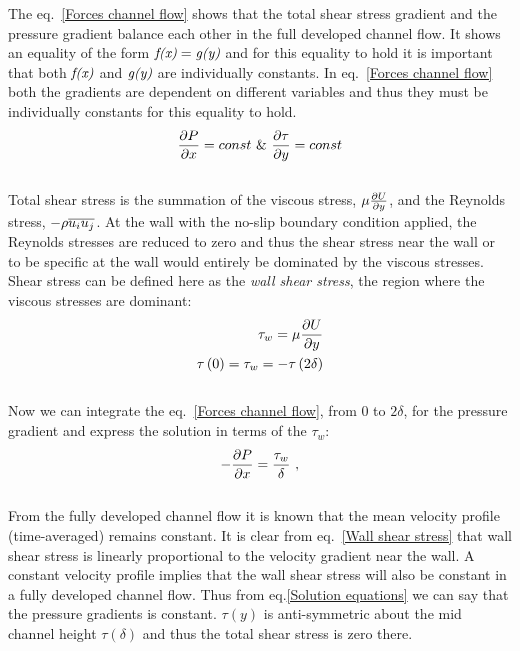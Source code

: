 The eq.~\ref{Forces channel flow} shows that the total shear stress gradient and the pressure gradient balance each other in the full developed channel flow. It shows an equality of the form $\emph{f(x)}= \emph{g(y)}$ and for this equality to hold it is important that both $\emph{f(x)}$ and $\emph{g(y)}$ are individually constants. In eq.~\ref{Forces channel flow} both the gradients are dependent on different variables and thus they must be individually constants for this equality to hold. $$\frac{\partial P}{\partial x} = const\  \&\  \frac{\partial \tau}{\partial y} = const$$\\
%
Total shear stress is the summation of the viscous stress, $ \mu \frac{\partial U}{\partial y} $, and the Reynolds stress, $- \rho\overline{u_iu_j}$. At the wall with the no-slip boundary condition applied, the Reynolds stresses are reduced to zero and thus the shear stress near the wall or to be specific at the wall would entirely be dominated by the viscous stresses. Shear stress can be defined here as the \emph{wall shear stress}, the region where the viscous stresses are dominant:
\begin{equation}
\label{Wall shear stress}
\begin{split}
\tau_w = \mu \frac{\partial U}{\partial y}\\
\tau\left(0\right) = \tau_w  = -\tau\left(2\delta\right)\\
\end{split}
\end{equation}\\
%
Now we can integrate the eq.~\ref{Forces channel flow}, from 0 to $2\delta$, for the pressure gradient and express the solution in terms of the $\tau_w$:
%
\begin{equation}
\label{Solution equations}
\begin{split}
-\frac{\partial P}{\partial x} = \frac{\tau_w}{\delta} \ ,\\
\end{split}
\end{equation}\\ 
%
From the fully developed channel flow it is known that the mean velocity profile (time-averaged) remains constant. It is clear from eq.~\ref{Wall shear stress} that wall shear stress is linearly proportional to the velocity gradient near the wall. A constant velocity profile implies that the wall shear stress will also be constant in a fully developed channel flow. Thus from eq.\ref{Solution equations} we can say that the pressure gradients is constant. $\tau\left(y\right)$ is anti-symmetric about the mid channel height $\tau\left(\delta\right)$ and thus the total shear stress is zero there. 
